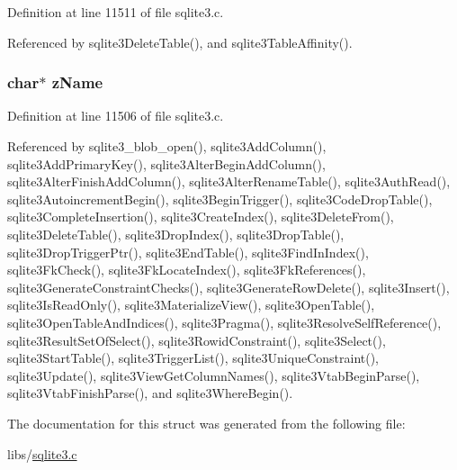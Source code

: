 Definition at line 11511 of file sqlite3.\+c.



Referenced by sqlite3\+Delete\+Table(), and sqlite3\+Table\+Affinity().

\hypertarget{struct_table_a661118d86ac4127d40bf3be78d92117d}{}
\subsubsection[{z\+Name}]{\setlength{\rightskip}{0pt plus 5cm}char$\ast$ z\+Name}\label{struct_table_a661118d86ac4127d40bf3be78d92117d}


Definition at line 11506 of file sqlite3.\+c.



Referenced by sqlite3\+\_\+blob\+\_\+open(), sqlite3\+Add\+Column(), sqlite3\+Add\+Primary\+Key(), sqlite3\+Alter\+Begin\+Add\+Column(), sqlite3\+Alter\+Finish\+Add\+Column(), sqlite3\+Alter\+Rename\+Table(), sqlite3\+Auth\+Read(), sqlite3\+Autoincrement\+Begin(), sqlite3\+Begin\+Trigger(), sqlite3\+Code\+Drop\+Table(), sqlite3\+Complete\+Insertion(), sqlite3\+Create\+Index(), sqlite3\+Delete\+From(), sqlite3\+Delete\+Table(), sqlite3\+Drop\+Index(), sqlite3\+Drop\+Table(), sqlite3\+Drop\+Trigger\+Ptr(), sqlite3\+End\+Table(), sqlite3\+Find\+In\+Index(), sqlite3\+Fk\+Check(), sqlite3\+Fk\+Locate\+Index(), sqlite3\+Fk\+References(), sqlite3\+Generate\+Constraint\+Checks(), sqlite3\+Generate\+Row\+Delete(), sqlite3\+Insert(), sqlite3\+Is\+Read\+Only(), sqlite3\+Materialize\+View(), sqlite3\+Open\+Table(), sqlite3\+Open\+Table\+And\+Indices(), sqlite3\+Pragma(), sqlite3\+Resolve\+Self\+Reference(), sqlite3\+Result\+Set\+Of\+Select(), sqlite3\+Rowid\+Constraint(), sqlite3\+Select(), sqlite3\+Start\+Table(), sqlite3\+Trigger\+List(), sqlite3\+Unique\+Constraint(), sqlite3\+Update(), sqlite3\+View\+Get\+Column\+Names(), sqlite3\+Vtab\+Begin\+Parse(), sqlite3\+Vtab\+Finish\+Parse(), and sqlite3\+Where\+Begin().



The documentation for this struct was generated from the following file\+:\begin{DoxyCompactItemize}
\item 
libs/\hyperlink{sqlite3_8c}{sqlite3.\+c}\end{DoxyCompactItemize}
